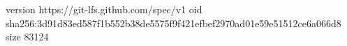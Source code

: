 version https://git-lfs.github.com/spec/v1
oid sha256:3d91d83ed587f1b552b38de5575f9f421efbef2970ad01e59e51512ce6a066d8
size 83124
